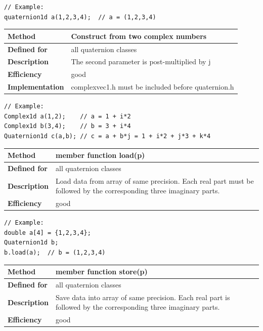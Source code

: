 \documentclass[11pt,a4paper,oneside,openright]{report}
\newcommand{\vspacesmall}{\vspace{3mm}}
\newcommand{\vspacebig}{\vspace{6mm}}
\begin{document}
\begin{lstlisting}[frame=none]
// Example:
quaternion1d a(1,2,3,4);  // a = (1,2,3,4)
\end{lstlisting}
\vspacebig


\begin{tabular}{|p{25mm}|p{100mm}|}
\hline
\bfseries Method & Construct from two complex numbers \\ \hline
\bfseries Defined for & all quaternion classes \\ \hline
\bfseries Description & The second parameter is post-multiplied by j \\ \hline
\bfseries Efficiency & good \\ \hline
\bfseries Implementation & complexvec1.h must be included before quaternion.h \\ \hline
\end{tabular}
\vspacesmall

\begin{lstlisting}[frame=none]
// Example:
Complex1d a(1,2);    // a = 1 + i*2
Complex1d b(3,4);    // b = 3 + i*4
Quaternion1d c(a,b); // c = a + b*j = 1 + i*2 + j*3 + k*4
\end{lstlisting}
\vspacebig

\begin{tabular}{|p{25mm}|p{100mm}|}
\hline
\bfseries Method & member function load(p) \\ \hline
\bfseries Defined for & all quaternion classes \\ \hline
\bfseries Description & Load data from array of same precision. 
Each real part must be followed by the corresponding three imaginary parts. \\ \hline
\bfseries Efficiency & good \\ \hline
\end{tabular}
\vspacesmall

\begin{lstlisting}[frame=none]
// Example:
double a[4] = {1,2,3,4};
Quaternion1d b;
b.load(a);  // b = (1,2,3,4)
\end{lstlisting}
\vspacebig


\begin{tabular}{|p{25mm}|p{100mm}|}
\hline
\bfseries Method & member function store(p) \\ \hline
\bfseries Defined for & all quaternion classes \\ \hline
\bfseries Description & Save data into array of same precision. 
Each real part is followed by the corresponding three imaginary parts. \\ \hline
\bfseries Efficiency & good \\ \hline
\end{tabular}
\vspacesmall
\end{document}
